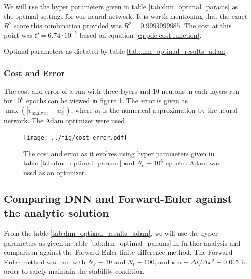 We will use the hyper parameters given in table \ref{tab:dnn_optimal_params} as the optimal settings for our neural network. It is worth mentioning that the exact $R^2$ score this combination provided was $R^2=0.9999999985$. The cost at this point was $\mathcal{C} = 6.74 \cdot 10^{-7}$ based on equation \eqref{eq:pde-cost-function}.
\begin{table}[h!tb]
    \centering
    \caption{Optimal parameters as dictated by table \ref{tab:dnn_optimal_results_adam}.}
    \label{tab:dnn_optimal_params}
\end{table}

\subsubsection{Cost and Error} 
The cost and error of a run with three layers and 10 neurons in each layers run for $10^6$ epochs can be viewed in figure \ref{fig:cost-error}. The error is given as $\max \left( | u_\mathrm{analytic} - u_t | \right)$, where $u_t$ is the numerical approximation by the neural network. The Adam optimizer were used.
\begin{figure}
    \centering
    \texttt{[image: ../fig/cost\_error.pdf]}
    \caption{The cost and error as it evolves using hyper parameters given in table \ref{tab:dnn_optimal_params} and $N_\mathrm{e}=10^6$ epochs. Adam was used as an optimizer.}
    \label{fig:cost-error}
\end{figure}



\subsection{Comparing DNN and Forward-Euler against the analytic solution}
From the table \ref{tab:dnn_optimal_results_adam}, we will use the hyper parameters as given in table \ref{tab:dnn_optimal_params} in further analysis and comparison against the Forward-Euler finite difference method. The Forward-Euler method was run with $N_x=10$ and $N_t=100$, and a $\alpha=\Delta t / \Delta x^2=0.005$ in order to safely maintain the stability condition.

